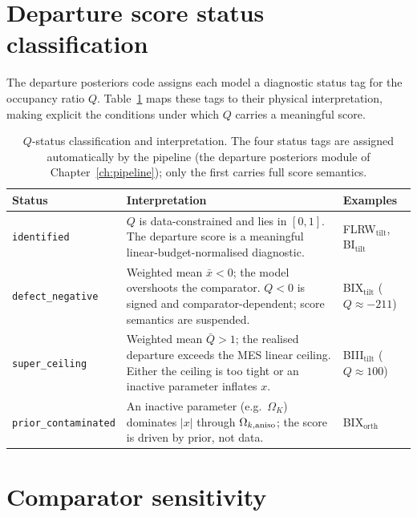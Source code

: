 \section{Departure score status classification}\label{sec:Q-status}

The departure posteriors code assigns each model a diagnostic
status tag for the occupancy ratio $Q$.
Table~\ref{tab:Q-status} maps these tags to their physical
interpretation, making explicit the conditions under which $Q$
carries a meaningful score.

\begin{table}[ht]
\centering
\caption{$Q$-status classification and interpretation.  The
  four status tags are assigned automatically by the pipeline
  (the departure posteriors module of
  Chapter~\ref{ch:pipeline}); only the first carries full
  score semantics.}
\label{tab:Q-status}
\footnotesize
\begin{tabular}{lp{6.8cm}l}
\toprule
Status & Interpretation & Examples \\
\midrule
\texttt{identified}
  & $Q$ is data-constrained and lies in $[0,1]$.
    The departure score is a meaningful
    linear-budget-normalised diagnostic.
  & FLRW$_{\mathrm{tilt}}$, BI$_{\mathrm{tilt}}$ \\[4pt]
\texttt{defect\_negative}
  & Weighted mean $\bar{x} < 0$; the model overshoots the
    comparator.  $Q < 0$ is signed and
    comparator-dependent; score semantics are suspended.
  & BIX$_{\mathrm{tilt}}$ ($Q \approx -211$) \\[4pt]
\texttt{super\_ceiling}
  & Weighted mean $\bar{Q} > 1$; the realised
    departure exceeds the MES linear ceiling.
    Either the ceiling is too tight or an inactive
    parameter inflates $x$.
  & BIII$_{\mathrm{tilt}}$ ($Q \approx 100$) \\[4pt]
\texttt{prior\_contaminated}
  & An inactive parameter (e.g.\ $\Omega_K$) dominates
    $|x|$ through $\Omega_{k,\mathrm{aniso}}$; the score is driven by
    prior, not data.
  & BIX$_{\mathrm{orth}}$ \\
\bottomrule
\end{tabular}
\end{table}


\section{Comparator sensitivity}\label{sec:comp-robust}

